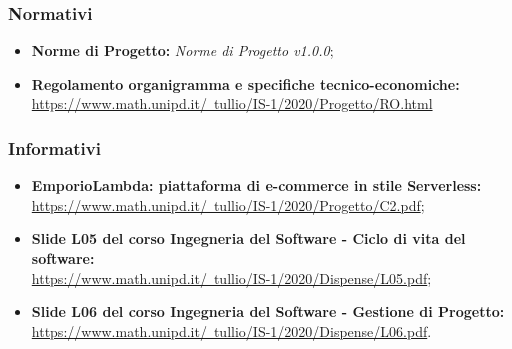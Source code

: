         \subsubsection{Normativi}
        \begin{itemize}
            \item \textbf{Norme di Progetto: } \emph{Norme di Progetto v1.0.0};
            \item \textbf{Regolamento organigramma e specifiche tecnico-economiche: } \\ \href{https://www.math.unipd.it/~tullio/IS-1/2020/Progetto/RO.html}{https://www.math.unipd.it/~tullio/IS-1/2020/Progetto/RO.html}
        \end{itemize}
        \subsubsection{Informativi}
        \begin{itemize}
            \item \textbf{EmporioLambda: piattaforma di e-commerce in stile Serverless: } \\ \href{https://www.math.unipd.it/~tullio/IS-1/2020/Progetto/C2.pdf}{https://www.math.unipd.it/~tullio/IS-1/2020/Progetto/C2.pdf};
            \item \textbf{Slide L05 del corso Ingegneria del Software - Ciclo di vita del software: } \\ \href{https://www.math.unipd.it/~tullio/IS-1/2020/Dispense/L05.pdf}{https://www.math.unipd.it/~tullio/IS-1/2020/Dispense/L05.pdf};
            \item \textbf{Slide L06 del corso Ingegneria del Software - Gestione di Progetto: } \\ \href{https://www.math.unipd.it/~tullio/IS-1/2020/Dispense/L06.pdf}{https://www.math.unipd.it/~tullio/IS-1/2020/Dispense/L06.pdf}.
        \end{itemize}
